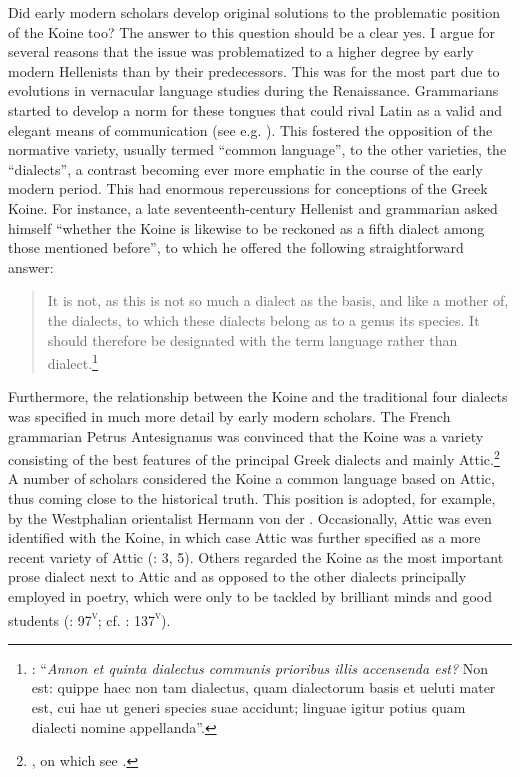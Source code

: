 {Did early modern scholars develop original solutions to the problematic position of the Koine too? The answer to this question should be a clear yes. I argue for several reasons that the issue was problematized to a higher degree by early modern Hellenists than by their predecessors. This was for the most part due to evolutions in vernacular language studies during the Renaissance. Grammarians started to develop a norm for these tongues that could rival Latin as a valid and elegant means of communication (see e.g. \citealt{Giard1992}). This fostered the opposition of the normative variety, usually termed “common language”, to the other varieties, the “dialects”, a contrast becoming ever more emphatic in the course of the early modern period. This had enormous repercussions for conceptions of the Greek Koine. For instance, a late seventeenth-century Hellenist and grammarian asked himself “whether the Koine is likewise to be reckoned as a fifth dialect among those mentioned before”, to which he offered the following straightforward answer:

\begin{quote}
It is not, as this is not so much a dialect as the basis, and like a mother of, the dialects, to which these dialects belong as to a genus its species. It should therefore be designated with the term language rather than dialect.\footnote{\citet[495]{Ursin1691}: “\textit{Annon et quinta dialectus communis prioribus illis accensenda est?} Non est: quippe haec non tam dialectus, quam dialectorum basis et ueluti mater est, cui hae ut generi species suae accidunt; linguae igitur potius quam dialecti nomine appellanda”.}
\end{quote}

Furthermore, the relationship between the Koine and the traditional four dialects was specified in much more detail by early modern scholars. The French grammarian Petrus Antesignanus was convinced that the Koine was a variety consisting of the best features of the principal Greek dialects and mainly Attic.\footnote{\citet[12--13]{Antesignanus1554}, on which see \citet[130--131]{VanRooy2016c}.} A number of scholars considered the Koine a common language based on Attic, thus coming close to the historical truth. This position is adopted, for example, by the Westphalian orientalist Hermann von der \citet[17–18, (1660–1746)]{Von1705}. Occasionally, Attic was even identified with the Koine, in which case Attic was further specified as a more recent variety of Attic (\citealt{Georgi1733}: 3, 5). Others regarded the Koine as the most important prose dialect next to Attic and as opposed to the other dialects principally employed in poetry, which were only to be tackled by brilliant minds and good students (\citealt{Vives1531}: 97\textsc{\textsuperscript{v}}; cf. \citealt{Vuidius1569}: 137\textsc{\textsuperscript{v}}).

}
